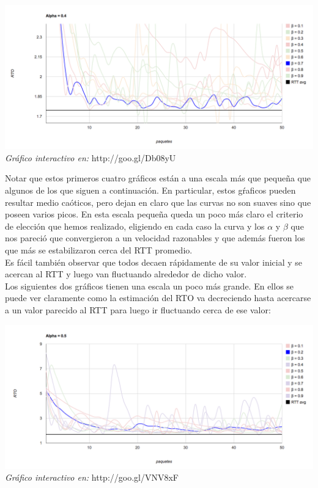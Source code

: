 \begin{center}
	\includegraphics[scale=0.35]{graphics/rto_vs_paquetes_a_4.png}
	\textit{Gráfico interactivo en:} http://goo.gl/Db08yU
\end{center}


\indent Notar que estos primeros cuatro gráficos están a una escala más que pequeña que algunos de los que siguen a continuación. En particular, estos gŕaficos pueden resultar medio caóticos, pero dejan en claro que las curvas no son suaves sino que poseen varios picos. En esta escala pequeña queda un poco más claro el criterio de elección que hemos realizado, eligiendo en cada caso la curva y los $\alpha$ y $\beta$ que nos pareció que convergieron a un velocidad razonables y que además fueron los que más se estabilizaron cerca del RTT promedio.\\

\indent Es fácil también observar que todos decaen rápidamente de su valor inicial y se acercan al RTT y luego van fluctuando alrededor de dicho valor.\\

\indent Los siguientes dos gráficos tienen una escala un poco más grande. En ellos se puede ver claramente como la estimación del RTO va decreciendo hasta acercarse a un valor parecido al RTT para luego ir fluctuando cerca de ese valor:\\

\begin{center}
	\includegraphics[scale=0.35]{graphics/rto_vs_paquetes_a_5.png}
	\textit{Gráfico interactivo en:} http://goo.gl/VNV8xF
\end{center}

